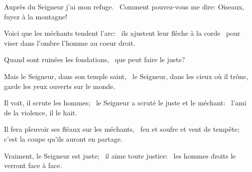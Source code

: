 \item Auprès du Seigneur j'ai mon refuge.~\psstar{} Comment pouvez-vous me dire: Oiseaux, fuyez à la montagne!
\item Voici que les méchants tendent l'arc:~\pscross{} ils ajustent leur flèche à la corde~\psstar{} pour viser dans l'ombre l'homme au coeur droit.
\item Quand sont ruinées les fondations,~\psstar{} que peut faire le juste?
\item Mais le Seigneur, dans son temple saint,~\pscross{} le Seigneur, dans les cieux où il trône,~\psstar{} garde les yeux ouverts sur le monde.
\item Il voit, il scrute les hommes;~\pscross{} le Seigneur a scruté le juste et le méchant:~\psstar{} l'ami de la violence, il le hait.
\item Il fera pleuvoir ses fléaux sur les méchants,~\pscross{} feu et soufre et vent de tempête;~\psstar{} c'est la coupe qu'ils auront en partage.
\item Vraiment, le Seigneur est juste;~\pscross{} il aime toute justice:~\psstar{} les hommes droits le verront face à face.